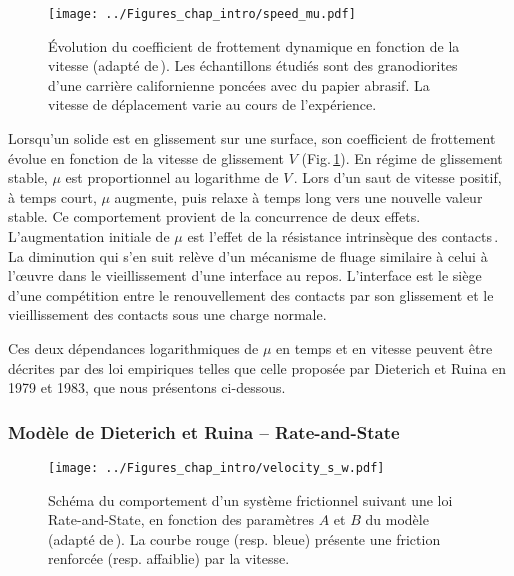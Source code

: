 \begin{figure}[htb]
\centering\texttt{[image: ../Figures\_chap\_intro/speed\_mu.pdf]}
\caption[Évolution de $\mu$ lors d'un saut de vitesse]{Évolution du coefficient de frottement dynamique en fonction de la vitesse (adapté de\,\cite{dieterich_modeling_1979}). Les échantillons étudiés sont des granodiorites d'une carrière californienne poncées avec du papier abrasif. La vitesse de déplacement varie au cours de l'expérience.}
\label{fig:speed_mu}
\end{figure}





Lorsqu'un solide est en glissement sur une surface, son coefficient de frottement évolue en fonction de la vitesse de glissement $V$ (Fig.\,\ref{fig:speed_mu}). En régime de glissement stable, $\mu$ est proportionnel au logarithme de  $V$\,\cite{ruina_slip_1983,stesky_mechanisms_1978,blanpied_frictional_1987,dieterich_direct_1994}. Lors d'un saut de vitesse positif, à temps court, $\mu$ augmente, puis relaxe à temps long vers une nouvelle valeur stable. Ce comportement provient de la concurrence de deux effets. L'augmentation initiale de $\mu$ est l'effet de la résistance intrinsèque des contacts\,\cite{dieterich_direct_1994}. La diminution qui s'en suit relève d'un mécanisme de fluage similaire à celui à l'œuvre dans le vieillissement d'une interface au repos.
L'interface est le siège d'une compétition entre le renouvellement des contacts par son glissement et le vieillissement des contacts sous une charge normale.


Ces deux dépendances logarithmiques de $\mu$ en temps et en vitesse peuvent être décrites par des loi empiriques telles que celle proposée par Dieterich et Ruina en 1979 et 1983, que nous présentons ci-dessous.

\subsubsection{Modèle de Dieterich et Ruina -- Rate-and-State}
\label{sec:rateandstate}


\begin{figure}[h!]
\centering
\texttt{[image: ../Figures\_chap\_intro/velocity\_s\_w.pdf]}
\caption[Comportement du modèle Rate-and-State]{Schéma du comportement d'un système frictionnel suivant une loi Rate-and-State, en fonction des paramètres $A$ et $B$ du modèle (adapté de\,\cite{zhang_frictional_2022}). La courbe rouge (resp. bleue) présente une friction renforcée (resp. affaiblie) par la vitesse.}
\label{fig:velocity_s_w}
\end{figure}

